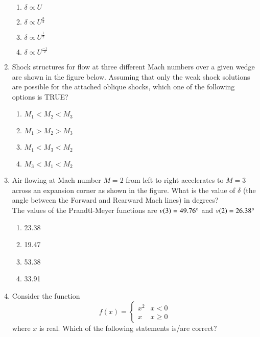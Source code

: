 \documentclass[journal,12pt,onecolumn]{IEEEtran}
\theoremstyle{remark}
\begin{document}
\begin{enumerate}
    \begin{enumerate}
        \item $\delta \propto U$
        \item $\delta \propto {U}^{\frac{3}{2}}$
        \item $\delta \propto {U}^{\frac{1}{2}}$
        \item $\delta \propto {U}^{\frac{-1}{2}}$
    \end{enumerate}
    
    \item Shock structures for flow at three different Mach numbers over a given wedge are shown in the figure below. Assuming that only the weak shock solutions are possible for the attached oblique shocks, which one of the following options is TRUE?
    
    \begin{figure}[H]
        \centering
          
    \end{figure}
    
    \begin{enumerate}
        \item $M_1<M_2<M_3$
        \item $M_1>M_2>M_3$
        \item $M_1<M_3<M_2$
        \item $M_3<M_1<M_2$
    \end{enumerate}
    
    \item Air flowing at Mach number $M = 2$ from left to right accelerates to $M = 3$ across an expansion corner as shown in the figure. What is the value of $\delta$ (the angle between the Forward and Rearward Mach lines) in degrees? \\ The values of the Prandtl-Meyer functions are $v(3)=49.76 \degree$ and $v(2)=26.38\degree$
    
    \begin{figure}[H]
        \centering
        
    \end{figure}
    
    \begin{enumerate}
        \item 23.38
        \item 19.47
        \item 53.38
        \item 33.91
    \end{enumerate}
    
    \item Consider the function 
    \[
    f(x)= 
    \begin{cases} 
        x^2 & x<0 \\
        x & x \geq 0 
    \end{cases}
    \]
    where $x$ is real. Which of the following statements is/are correct?
    

\end{enumerate}
\end{document}
